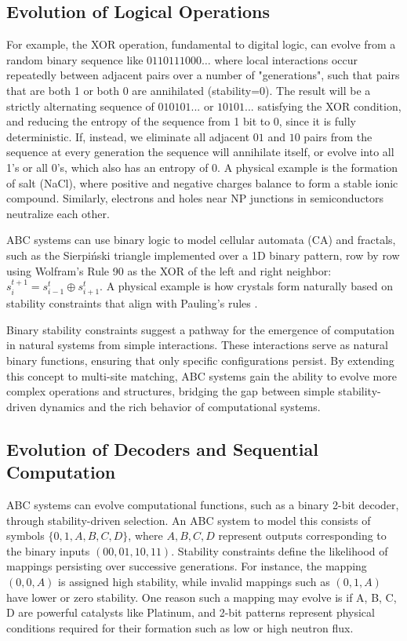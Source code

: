 \documentclass[entropy,article,submit,pdftex,moreauthors]{Definitions/mdpi}
\begin{document}
\subsection{Evolution of Logical Operations}

For example, the XOR operation, fundamental to digital logic, can evolve from a random binary sequence  like \( 0110111000\dots \) where local interactions occur repeatedly between adjacent pairs over a number of "generations", such that pairs that are both 1 or both 0 are annihilated (stability=0). The result will be a strictly alternating sequence of \( 010101... \) or \( 10101... \) satisfying the XOR condition, and reducing the entropy of the sequence from 1 bit to 0, since it is fully deterministic. If, instead, we eliminate all adjacent \( 01 \) and \( 10 \) pairs from the sequence at every generation the sequence will annihilate itself, or evolve into all 1's or all 0's, which also has an entropy of 0. A physical example is the formation of salt (NaCl), where positive and negative charges balance to form a stable ionic compound. Similarly, electrons and holes near NP junctions in semiconductors neutralize each other.

ABC systems can use binary logic to model cellular automata (CA) and fractals, such as the Sierpiński triangle implemented over a 1D binary pattern, row by row using Wolfram's Rule 90 \cite{wolfram1983statistical} as the XOR of the left and right neighbor: \( s_{i}^{t+1} = s_{i-1}^t \oplus s_{i+1}^t \). A physical example is how crystals form naturally based on stability constraints that align with Pauling's rules \cite{pauling1960nature}. 

Binary stability constraints suggest a pathway for the emergence of computation in natural systems from simple interactions. These interactions serve as natural binary functions, ensuring that only specific configurations persist. By extending this concept to multi-site matching, ABC systems gain the ability to evolve more complex operations and structures, bridging the gap between simple stability-driven dynamics and the rich behavior of computational systems.

\subsection{Evolution of Decoders and Sequential Computation}

ABC systems can evolve computational functions, such as a binary 2-bit decoder, through stability-driven
selection. An ABC system to model this consists of symbols \(\{0, 1, A, B, C, D\}\), where \(A, B, C, D\) represent outputs corresponding to the binary inputs \((00, 01, 10, 11)\). Stability constraints define the likelihood of mappings persisting over successive generations. For instance, the mapping \((0, 0, A)\) is assigned high stability, while invalid mappings such as \((0, 1, A)\) have lower or zero stability. One reason such a mapping may evolve is if A, B, C, D are powerful catalysts like Platinum, and 2-bit patterns represent physical conditions required for their formation such as low or high neutron flux.
\end{document}

